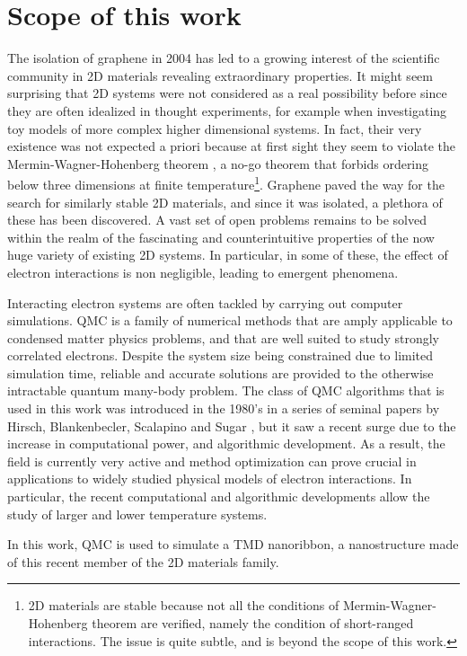 \section{Scope of this work}
\label{sec:scope}

The isolation of graphene in 2004 has led to a growing interest of the scientific community in \ac{2D} materials revealing extraordinary properties.
It might seem surprising that \ac{2D} systems were not considered as a real possibility before since they are often idealized in thought experiments, for example when investigating toy models of more complex higher dimensional systems.
In fact, their very existence was not expected a priori because at first sight they seem to violate the Mermin-Wagner-Hohenberg theorem \cite{mermin_absence_1966, coleman_there_1973, hohenberg_existence_1967}, a no-go theorem that forbids ordering below three dimensions at finite temperature\footnote{\ac{2D} materials are stable because not all the conditions of Mermin-Wagner-Hohenberg theorem are verified, namely the condition of short-ranged interactions. The issue is quite subtle, and is beyond the scope of this work.}.
Graphene paved the way for the search for similarly stable \ac{2D} materials, and since it was isolated, a plethora of these has been discovered.
A vast set of open problems remains to be solved within the realm of the fascinating and counterintuitive properties of the now huge variety of existing \ac{2D} systems.
In particular, in some of these, the effect of electron interactions is non negligible, leading to emergent phenomena.

Interacting electron systems are often tackled by carrying out computer simulations.
\ac{QMC} is a family of numerical methods that are  amply applicable to condensed matter physics problems, and that are well suited to study strongly correlated electrons.
Despite the system size being constrained due to limited simulation time, reliable and accurate solutions are provided to the otherwise intractable quantum many-body problem.
The class of \acs{QMC} algorithms that is used in this work was introduced in the 1980's in a series of seminal papers by Hirsch, Blankenbecler, Scalapino and Sugar \cite{hirsch_discrete_1983, hirsch_monte_1982, blankenbecler_monte_1981, hirsch_two-dimensional_1985, hirsch_monte_1983, hirsch_stable_1988, hirsch_antiferromagnetism_1989}, but it saw a recent surge due to the increase in computational power, and algorithmic development.
As a result, the field is currently very active and method optimization can prove crucial in applications to widely studied physical models of electron interactions.
In particular, the recent computational and algorithmic developments allow the study of larger and lower temperature systems.

In this work, \acs{QMC} is used to simulate a \ac{TMD} nanoribbon, a nanostructure made of this recent member of the \acs{2D} materials family.